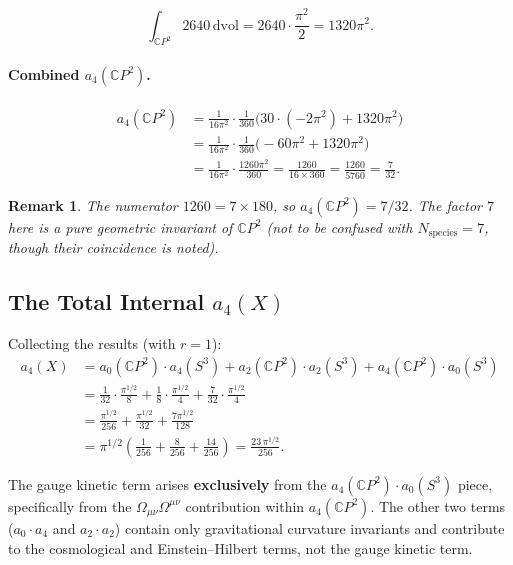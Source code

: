 \documentclass[12pt,a4paper]{article}
\newtheorem{remark}[theorem]{Remark}
\begin{document}
\begin{equation}
\int_{\mathbb{C}P^2} 2640\,\mathrm{dvol} = 2640 \cdot \frac{\pi^2}{2} = 1320\pi^2.
\end{equation}

\paragraph{Combined $a_4(\mathbb{C}P^2)$.}
\begin{align}
a_4(\mathbb{C}P^2) &= \frac{1}{16\pi^2} \cdot \frac{1}{360}
\Big(30 \cdot (-2\pi^2) + 1320\pi^2\Big) \nonumber\\
&= \frac{1}{16\pi^2} \cdot \frac{1}{360}
\Big(-60\pi^2 + 1320\pi^2\Big) \nonumber\\
&= \frac{1}{16\pi^2} \cdot \frac{1260\pi^2}{360}
= \frac{1260}{16 \times 360}
= \frac{1260}{5760}
= \frac{7}{32}. \label{eq:a4-CP2}
\end{align}

\begin{remark}
The numerator $1260 = 7 \times 180$, so $a_4(\mathbb{C}P^2) = 7/32$.
The factor $7$ here is a pure geometric invariant of $\mathbb{C}P^2$
(not to be confused with $N_{\mathrm{species}} = 7$, though their coincidence
is noted).
\end{remark}

\subsection{The Total Internal $a_4(X)$}

Collecting the results (with $r = 1$):
\begin{align}
a_4(X) &= a_0(\mathbb{C}P^2) \cdot a_4(S^3)
+ a_2(\mathbb{C}P^2) \cdot a_2(S^3)
+ a_4(\mathbb{C}P^2) \cdot a_0(S^3) \nonumber\\
&= \frac{1}{32} \cdot \frac{\pi^{1/2}}{8}
+ \frac{1}{8} \cdot \frac{\pi^{1/2}}{4}
+ \frac{7}{32} \cdot \frac{\pi^{1/2}}{4} \nonumber\\
&= \frac{\pi^{1/2}}{256}
+ \frac{\pi^{1/2}}{32}
+ \frac{7\pi^{1/2}}{128} \nonumber\\
&= \pi^{1/2}\left(\frac{1}{256} + \frac{8}{256} + \frac{14}{256}\right)
= \frac{23\,\pi^{1/2}}{256}. \label{eq:a4-total}
\end{align}

\begin{tcolorbox}[colback=green!5!white, colframe=green!50!black,
  title=Key Result: Gauge-Kinetic Isolation]
The gauge kinetic term arises \textbf{exclusively} from the
$a_4(\mathbb{C}P^2) \cdot a_0(S^3)$ piece, specifically from the
$\Omega_{\mu\nu}\Omega^{\mu\nu}$ contribution within
$a_4(\mathbb{C}P^2)$.  The other two terms
($a_0 \cdot a_4$ and $a_2 \cdot a_2$) contain only gravitational
curvature invariants and contribute to the cosmological and
Einstein--Hilbert terms, not the gauge kinetic term.
\end{tcolorbox}
\end{document}
